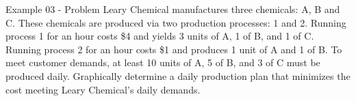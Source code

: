 \begin{frame}{Example 03 - Problem}
Leary Chemical manufactures three chemicals: A, B and C. These chemicals are 
produced via two production processes: 1 and 2. Running process 1 for an hour 
costs \$4 and yields 3 units of A, 1 of B, and 1 of C. Running process 2 for 
an hour costs \$1 and produces 1 unit of A and 1 of B. To meet customer demands, 
at least 10 units of A, 5 of B, and 3 of C must be produced daily. Graphically 
determine a daily production plan that minimizes the cost meeting Leary 
Chemical's daily demands.
\end{frame}
